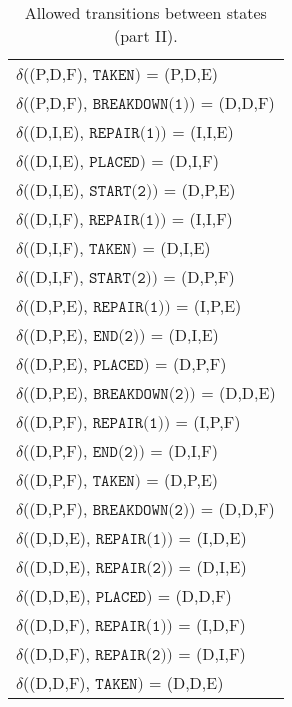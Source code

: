 \begin{table}[H]\centering
  \begin{tabular}{l}
    $\delta$((P,D,F), $\texttt{TAKEN})$ = (P,D,E)         \\
    $\delta$((P,D,F), $\texttt{BREAKDOWN(1)})$ = (D,D,F)  \\
    $\delta$((D,I,E), $\texttt{REPAIR(1)})$ = (I,I,E)     \\
    $\delta$((D,I,E), $\texttt{PLACED})$ = (D,I,F)        \\
    $\delta$((D,I,E), $\texttt{START(2)})$ = (D,P,E)      \\
    $\delta$((D,I,F), $\texttt{REPAIR(1)})$ = (I,I,F)     \\
    $\delta$((D,I,F), $\texttt{TAKEN})$ = (D,I,E)         \\
    $\delta$((D,I,F), $\texttt{START(2)})$ = (D,P,F)      \\
    $\delta$((D,P,E), $\texttt{REPAIR(1)})$ = (I,P,E)     \\
    $\delta$((D,P,E), $\texttt{END(2)})$ = (D,I,E)        \\
    $\delta$((D,P,E), $\texttt{PLACED})$ = (D,P,F)        \\
    $\delta$((D,P,E), $\texttt{BREAKDOWN(2)})$ = (D,D,E)  \\
    $\delta$((D,P,F), $\texttt{REPAIR(1)})$ = (I,P,F)     \\
    $\delta$((D,P,F), $\texttt{END(2)})$ = (D,I,F)        \\
    $\delta$((D,P,F), $\texttt{TAKEN})$ = (D,P,E)         \\
    $\delta$((D,P,F), $\texttt{BREAKDOWN(2)})$ = (D,D,F)  \\
    $\delta$((D,D,E), $\texttt{REPAIR(1)})$ = (I,D,E)     \\
    $\delta$((D,D,E), $\texttt{REPAIR(2)})$ = (D,I,E)     \\
    $\delta$((D,D,E), $\texttt{PLACED})$ = (D,D,F)        \\
    $\delta$((D,D,F), $\texttt{REPAIR(1)})$ = (I,D,F)     \\
    $\delta$((D,D,F), $\texttt{REPAIR(2)})$ = (D,I,F)     \\
    $\delta$((D,D,F), $\texttt{TAKEN})$ = (D,D,E)         \\
  \end{tabular}
  \caption{Allowed transitions between states (part II).}
  \label{tbl:04.02_delta_2}
\end{table}

\begin{sidewaysfigure}
  \begin{figure}[H]\centering
    \scalebox{0.8}{}
    \caption{}
    \label{}
  \end{figure}
\end{sidewaysfigure}
